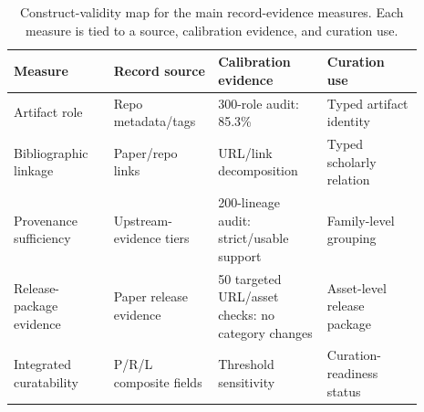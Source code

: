 \begin{table}[t]
\centering
\caption{Construct-validity map for the main record-evidence measures. Each measure is tied to a source, calibration evidence, and curation use.}
\label{tab:construct-validity-main}
\small
\setlength{\tabcolsep}{3pt}
\begin{tabular}{@{}p{0.22\linewidth}p{0.22\linewidth}p{0.24\linewidth}p{0.21\linewidth}@{}}
\toprule
Measure & Record source & Calibration evidence & Curation use \\
\midrule
Artifact role & Repo metadata/tags & 300-role audit: 85.3\% & Typed artifact identity \\
Bibliographic linkage & Paper/repo links & URL/link decomposition & Typed scholarly relation \\
Provenance sufficiency & Upstream-evidence tiers & 200-lineage audit: strict/usable support & Family-level grouping \\
Release-package evidence & Paper release evidence & 50 targeted URL/asset checks: no category changes & Asset-level release package \\
Integrated curatability & P/R/L composite fields & Threshold sensitivity & Curation-readiness status \\
\bottomrule
\end{tabular}
\end{table}
